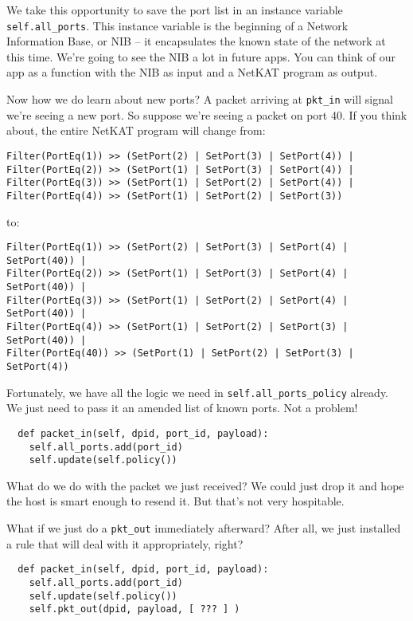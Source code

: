 We take this opportunity to save the port list in an instance variable \texttt{self.all\_ports}.  This instance variable
is the beginning of a Network Information Base, or NIB -- it encapsulates the known state of the network
at this time.  We're going to see the NIB a lot in future apps.  You can think of our app as a function with the
NIB as input and a NetKAT program as output.  

Now how we do learn about new ports?  A packet arriving at \texttt{pkt\_in} will signal we're seeing a new port.
So suppose we're seeing a packet on port 40.  If you think about, the entire NetKAT program will change from:

\begin{verbatim}
Filter(PortEq(1)) >> (SetPort(2) | SetPort(3) | SetPort(4)) |
Filter(PortEq(2)) >> (SetPort(1) | SetPort(3) | SetPort(4)) |
Filter(PortEq(3)) >> (SetPort(1) | SetPort(2) | SetPort(4)) |
Filter(PortEq(4)) >> (SetPort(1) | SetPort(2) | SetPort(3))
\end{verbatim}

to:

\begin{verbatim}
Filter(PortEq(1)) >> (SetPort(2) | SetPort(3) | SetPort(4) | SetPort(40)) |
Filter(PortEq(2)) >> (SetPort(1) | SetPort(3) | SetPort(4) | SetPort(40)) |
Filter(PortEq(3)) >> (SetPort(1) | SetPort(2) | SetPort(4) | SetPort(40)) |
Filter(PortEq(4)) >> (SetPort(1) | SetPort(2) | SetPort(3) | SetPort(40)) |
Filter(PortEq(40)) >> (SetPort(1) | SetPort(2) | SetPort(3) | SetPort(4))
\end{verbatim}

Fortunately, we have all the logic we need in \texttt{self.all\_ports\_policy} already.  We just need
to pass it an amended list of known ports.  Not a problem!

\begin{verbatim}
  def packet_in(self, dpid, port_id, payload):
    self.all_ports.add(port_id)
    self.update(self.policy())
\end{verbatim}

What do we do with the packet we just received? 
We could just drop it and hope the host is smart enough to resend it.  But that's not
very hospitable.  

What if we just do a \texttt{pkt\_out} immediately afterward?  After all, we just installed a rule that
will deal with it appropriately, right?

\begin{verbatim}
  def packet_in(self, dpid, port_id, payload):
    self.all_ports.add(port_id)
    self.update(self.policy())
    self.pkt_out(dpid, payload, [ ??? ] )
\end{verbatim}

